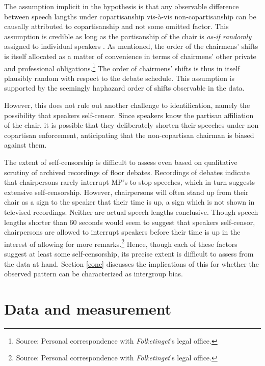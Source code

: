\documentclass[12pt,a4paper]{article}
\begin{document}
The assumption implicit in the hypothesis is that any observable difference between speech langths under copartisanship vis-à-vis non-copartisanship can be causally attributed to copartisanship and not some omitted factor. This assumption is credible as long as the partisanship of the chair is \textit{as-if randomly} assigned to individual speakers \citep{Dunning2007}. As mentioned, the order of the chairmens' shifts is itself allocated as a matter of convenience in terms of chairmens' other private and professional obligations.\footnote{Source: Personal correspondence with \textit{Folketinget}'s legal office.} The order of chairmens' shifts is thus in itself plausibly random with respect to the debate schedule. This assumption is supported by the seemingly haphazard order of shifts observable in the data.

However, this does not rule out another challenge to identification, namely the possibility that speakers self-censor. Since speakers know the partisan affiliation of the chair, it is possible that they deliberately shorten their speeches under non-copartisan enforcement, anticipating that the non-copartisan chairman is biased against them. 

The extent of self-censorship is difficult to assess even based on qualitative scrutiny of archived recordings of floor debates. Recordings of debates indicate that chairpersons rarely interrupt MP's to stop speeches, which in turn suggests extensive self-censorship. However, chairpersons will often stand up from their chair as a sign to the speaker that their time is up, a sign which is not shown in televised recordings. Neither are actual speech lengths conclusive. Though speech lengths shorter than 60 seconds would seem to suggest that speakers self-censor, chairpersons are allowed to interrupt speakers before their time is up in the interest of allowing for more remarks.\footnote{Source: Personal correspondence with \textit{Folketinget}'s legal office.}  Hence, though each of these factors suggest at least some self-censorship, its precise extent is difficult to assess from the data at hand. Section \ref{conc} discusses the implications of this for whether the observed pattern can be characterized as intergroup bias.



\section{Data and measurement}\label{data}
\end{document}
